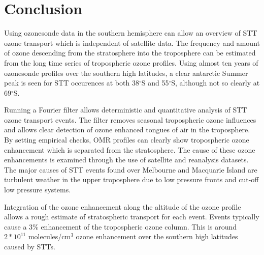 \documentclass{article}
\begin{document}
\section{Conclusion}
  
  Using ozonesonde data in the southern hemisphere can allow an overview of STT ozone transport which is independent of satellite data.
  The frequency and amount of ozone descending from the stratosphere into the troposphere can be estimated from the long time series of tropospheric ozone profiles.
  Using almost ten years of ozonesonde profiles over the southern high latitudes, a clear antarctic Summer peak is seen for STT occurences at both 38$^{\circ}$S and 55$^{\circ}$S, although not so clearly at 69$^{\circ}$S.
  
  Running a Fourier filter allows deterministic and quantitative analysis of STT ozone transport events.
  The filter removes seasonal tropospheric ozone influences and allows clear detection of ozone enhanced tongues of air in the troposphere.
  By setting empirical checks, OMR profiles can clearly show tropospheric ozone enhancement which is separated from the stratosphere.
  The cause of these ozone enhancements is examined through the use of satellite and reanalysis datasets.
  The major causes of STT events found over Melbourne and Macquarie Island are turbulent weather in the upper troposphere due to low pressure fronts and cut-off low pressure systems.
  
  Integration of the ozone enhancement along the altitude of the ozone profile allows a rough estimate of stratospheric transport for each event.
  Events typically cause a 3\% enhancement of the tropospheric ozone column.
  This is around $2*10^{11}$ molecules/cm$^3$ ozone enhancement over the southern high latitudes caused by STTs.
  
%


\end{document}
